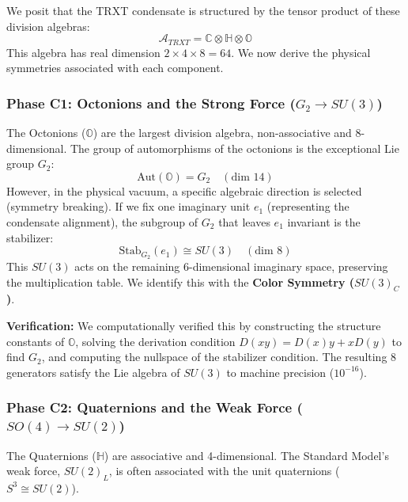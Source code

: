 We posit that the TRXT condensate is structured by the tensor product of these division algebras:
\begin{equation}
    \mathcal{A}_{TRXT} = \mathbb{C} \otimes \mathbb{H} \otimes \mathbb{O}
\end{equation}
This algebra has real dimension $2 \times 4 \times 8 = 64$. We now derive the physical symmetries associated with each component.

\subsubsection{Phase C1: Octonions and the Strong Force ($G_2 \to SU(3)$)}

The Octonions ($\mathbb{O}$) are the largest division algebra, non-associative and 8-dimensional. The group of automorphisms of the octonions is the exceptional Lie group $G_2$:
\begin{equation}
    \text{Aut}(\mathbb{O}) = G_2 \quad (\text{dim } 14)
\end{equation}
However, in the physical vacuum, a specific algebraic direction is selected (symmetry breaking). If we fix one imaginary unit $e_1$ (representing the condensate alignment), the subgroup of $G_2$ that leaves $e_1$ invariant is the stabilizer:
\begin{equation}
    \text{Stab}_{G_2}(e_1) \cong SU(3) \quad (\text{dim } 8)
\end{equation}
This $SU(3)$ acts on the remaining 6-dimensional imaginary space, preserving the multiplication table. We identify this with the \textbf{Color Symmetry ($SU(3)_C$)}.

\textbf{Verification:} We computationally verified this by constructing the structure constants of $\mathbb{O}$, solving the derivation condition $D(xy) = D(x)y + xD(y)$ to find $G_2$, and computing the nullspace of the stabilizer condition. The resulting 8 generators satisfy the Lie algebra of $SU(3)$ to machine precision ($10^{-16}$).

\subsubsection{Phase C2: Quaternions and the Weak Force ($SO(4) \to SU(2)$)}

The Quaternions ($\mathbb{H}$) are associative and 4-dimensional. The Standard Model's weak force, $SU(2)_L$, is often associated with the unit quaternions ($S^3 \cong SU(2)$).


